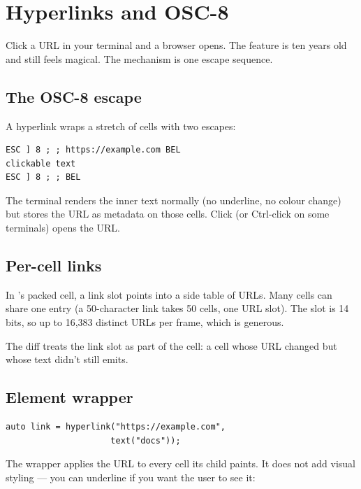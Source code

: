\chapter{Hyperlinks and OSC-8}
\label{ch:hyperlinks}

\begin{aside}
Click a URL in your terminal and a browser opens. The feature is
ten years old and still feels magical. The mechanism is one
escape sequence.
\end{aside}

\section{The OSC-8 escape}

A hyperlink wraps a stretch of cells with two escapes:

\begin{lstlisting}
ESC ] 8 ; ; https://example.com BEL
clickable text
ESC ] 8 ; ; BEL
\end{lstlisting}

The terminal renders the inner text normally (no underline, no
colour change) but stores the URL as metadata on those cells.
Click (or Ctrl-click on some terminals) opens the URL.

\section{Per-cell links}

In \maya{}'s packed cell, a link slot points into a side table
of URLs. Many cells can share one entry (a 50-character link
takes 50 cells, one URL slot). The slot is 14 bits, so up to
16,383 distinct URLs per frame, which is generous.

The diff treats the link slot as part of the cell: a cell whose
URL changed but whose text didn't still emits.

\section{Element wrapper}

\begin{lstlisting}
auto link = hyperlink("https://example.com",
                     text("docs"));
\end{lstlisting}

The wrapper applies the URL to every cell its child paints. It
does not add visual styling --- you can underline if you want
the user to see it:

